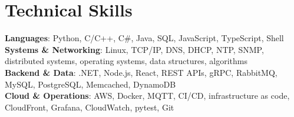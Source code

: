 \documentclass[letterpaper,11pt]{article}
\begin{document}
\section{Technical Skills}
\begin{itemize}[leftmargin=0.15in, label={}]
  \small{\item{
        \textbf{Languages}{: Python, C/C++, C\#, Java, SQL, JavaScript, TypeScript, Shell} \\
        \textbf{Systems \& Networking}{: Linux, TCP/IP, DNS, DHCP, NTP, SNMP, distributed systems, operating systems, data structures, algorithms} \\
        \textbf{Backend \& Data}{: .NET, Node.js, React, REST APIs, gRPC, RabbitMQ, MySQL, PostgreSQL, Memcached, DynamoDB} \\
        \textbf{Cloud \& Operations}{: AWS, Docker, MQTT, CI/CD, infrastructure as code, CloudFront, Grafana, CloudWatch, pytest, Git}
        }}
\end{itemize}

\end{document}
